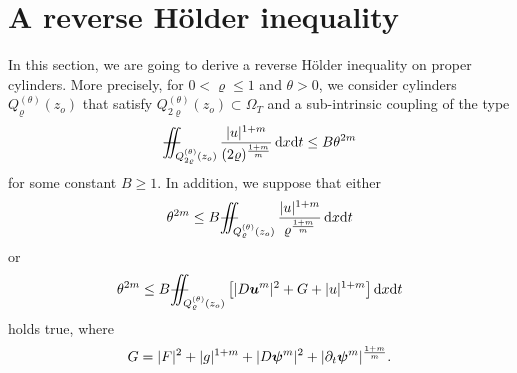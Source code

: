 \documentclass[a4paper, 10pt, american]{amsart}
\numberwithin{theorem}{section}
\numberwithin{equation}{section}
\newcommand{\dxdt}{\,\mathrm{d}x\mathrm{d}t}
\renewcommand{\rho}{\varrho}
\newcommand{\power}[2]{\bm{#1^{\mbox{\unboldmath{\scriptsize$#2$}}}}}
\def\Xiint#1{\mathchoice
    {\XXiint\displaystyle\textstyle{#1}}%
    {\XXiint\textstyle\scriptstyle{#1}}%
    {\XXiint\scriptstyle\scriptscriptstyle{#1}}%
    {\XXiint\scriptscriptstyle\scriptscriptstyle{#1}}%
    \!\iint}
\def\XXiint#1#2#3{\setbox0=\hbox{$#1{#2#3}{\iint}$}
    \vcenter{\hbox{$#2#3$}}\kern-0.5\wd0}
\def\biint{\Xiint{-\!-}}
\begin{document}
\section{A reverse H\"older inequality}

In this section, we are going to derive a reverse H\"older inequality
on proper cylinders.
More precisely, for $0<\rho\le1$ and $\theta>0$, we consider cylinders
$Q_{\rho}^{(\theta)}(z_o)$ that satisfy
$Q_{2\rho}^{(\theta)}(z_o)\subset\Omega_T$ and a sub-intrinsic
coupling of the type 
\begin{align}\label{Q-intrinsic}
\biint_{Q_{2\rho}^{(\theta)}(z_o)} \frac{|u|^{1+m}}{(2\rho)^{\frac{1+m}{m}}} \dxdt
\le
B\theta^{2m}
\end{align}
for some constant $B\ge1$.
In addition, we suppose that either
\begin{align}\label{Q-intrinsic-1}
\theta^{2m} \le B\biint_{Q_{\rho}^{(\theta)}(z_o)} \frac{|u|^{1+m}}{\rho^{\frac{1+m}{m}}} \dxdt
\end{align}
or
\begin{align}\label{Q-intrinsic-2}
\theta^{2m} \le B\biint_{Q_{\rho}^{(\theta)}(z_o)} \big[ |D\power um|^2+G+|u|^{1+m}\big] \dxdt
\end{align}
holds true, where
$$G=|F|^2+|g|^{1+m} +|D\power\psi m|^2+|\partial_t\power\psi m|^{\frac{1+m}m}.$$
\end{document}
